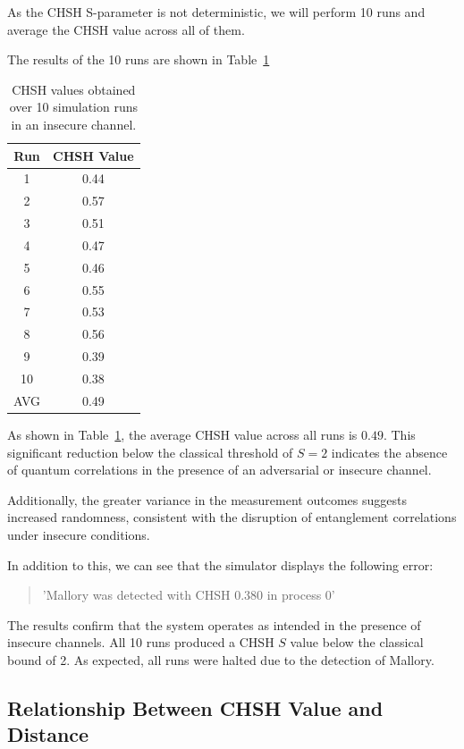 As the CHSH S-parameter is not deterministic, we will perform 10 runs and average the CHSH value across all of them. 

The results of the 10 runs are shown in Table~\ref{tab:chsh_runs_insecure}

\begin{table}[h]
\centering
\caption{CHSH values obtained over 10 simulation runs in an insecure channel.}
\label{tab:chsh_runs_insecure}
\begin{tabular}{cc}
\toprule
\textbf{Run} & \textbf{CHSH Value} \\
\midrule
1  &  0.44\\
2  &  0.57\\
3  &  0.51\\
4  &  0.47\\
5  &  0.46\\
6  &  0.55\\
7  &  0.53\\
8  &  0.56\\
9  &  0.39\\
10 &  0.38\\
\bottomrule
AVG & 0.49\\
\end{tabular}
\end{table}

As shown in Table~\ref{tab:chsh_runs_insecure}, the average CHSH value across all runs is \(0.49\). This significant reduction below the classical threshold of \(S = 2\) indicates the absence of quantum correlations in the presence of an adversarial or insecure channel.

Additionally, the greater variance in the measurement outcomes suggests increased randomness, consistent with the disruption of entanglement correlations under insecure conditions.

In addition to this, we can see that the simulator displays the following error:

\begin{quote}
'Mallory was detected with CHSH 0.380 in process 0'
\end{quote}

The results confirm that the system operates as intended in the presence of insecure channels. All 10 runs produced a CHSH $S$ value below the classical bound of 2. As expected, all runs were halted due to the detection of Mallory.
\subsection{Relationship Between CHSH Value and Distance}

